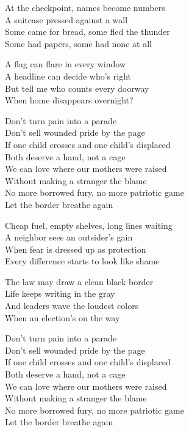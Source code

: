 \begin{lyrics}
At the checkpoint, names become numbers\\
A suitcase pressed against a wall\\
Some came for bread, some fled the thunder\\
Some had papers, some had none at all

A flag can flare in every window\\
A headline can decide who's right\\
But tell me who counts every doorway\\
When home disappears overnight?

Don't turn pain into a parade\\
Don't sell wounded pride by the page\\
If one child crosses and one child's displaced\\
Both deserve a hand, not a cage\\
We can love where our mothers were raised\\
Without making a stranger the blame\\
No more borrowed fury, no more patriotic game\\
Let the border breathe again

Cheap fuel, empty shelves, long lines waiting\\
A neighbor sees an outsider's gain\\
When fear is dressed up as protection\\
Every difference starts to look like shame

The law may draw a clean black border\\
Life keeps writing in the gray\\
And leaders wave the loudest colors\\
When an election's on the way

Don't turn pain into a parade\\
Don't sell wounded pride by the page\\
If one child crosses and one child's displaced\\
Both deserve a hand, not a cage\\
We can love where our mothers were raised\\
Without making a stranger the blame\\
No more borrowed fury, no more patriotic game\\
Let the border breathe again


\end{lyrics}
